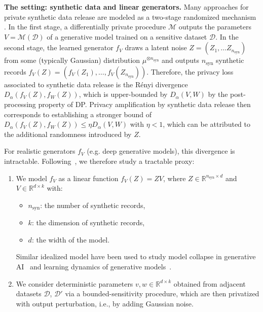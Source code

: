 \documentclass{article}
\theoremstyle{plain}
\theoremstyle{definition}
\theoremstyle{remark}
\begin{document}
\textbf{The setting: synthetic data and linear generators.} Many approaches for private synthetic data release are modeled as a two-stage randomized mechanism \citep{xie2018,Jordon2018,Lee2022,dockhorn2022}. In the first stage, a differentially private procedure $\mathcal{M}$ outputs the parameters $V=\mathcal{M}(\mathcal{D})$ of a generative model trained on a sensitive dataset $\mathcal{D}$. In the second stage, the learned generator $f_V$ draws a latent noise $Z = (Z_1, \dots Z_{n_{\text{syn}}})$ from some (typically Gaussian) distribution $\mu^{\otimes {n_{\text{syn}}}}$ and outputs $n_{\text{syn}}$ synthetic records $f_V(Z) = (f_V(Z_1),\dots, f_V(Z_{n_{\text{syn}}}))$. Therefore, the privacy loss associated to synthetic data release is the Rényi divergence $D_\alpha(f_V(Z), f_W(Z))$, which is upper-bounded by  $D_\alpha(V,W)$ by the post-processing property of DP. Privacy amplification by synthetic data release then corresponds to establishing a stronger bound of $D_\alpha(f_V(Z), f_W(Z)) \leq \eta D_\alpha(V,W)$ with $\eta < 1$, which can be attributed to the additional randomness introduced by $Z$.

For realistic generators $f_V$ (e.g. deep generative models), this divergence is intractable. Following~\citep{pierquin2025}, we therefore study a tractable proxy:
\begin{enumerate}
    \item We model $f_V$ as a linear function $f_V(Z) = ZV$, where $Z \in \mathbb{R}^{n_{\text{syn}} \times d}$ and $V \in \mathbb{R}^{d \times k}$ with:
    \begin{itemize}
        \item $n_{\text{syn}}$: the number of synthetic records,
        \item $k$: the dimension of synthetic records,
        \item $d$: the width of the model.
    \end{itemize}
    Similar idealized model have been used to study model collapse in generative AI~\cite{Dohmatob2024, Gerstgrasser2024} and learning dynamics of generative models~\citep{Lucas2019, Gemp2018}.
    \item We consider deterministic parameters $v,w \in \mathbb{R}^{d \times k}$ obtained from adjacent datasets $\mathcal{D}$, $\mathcal{D'}$ via a bounded-sensitivity procedure, which are then privatized with output perturbation, i.e., by adding Gaussian noise.
\end{enumerate}
\end{document}

